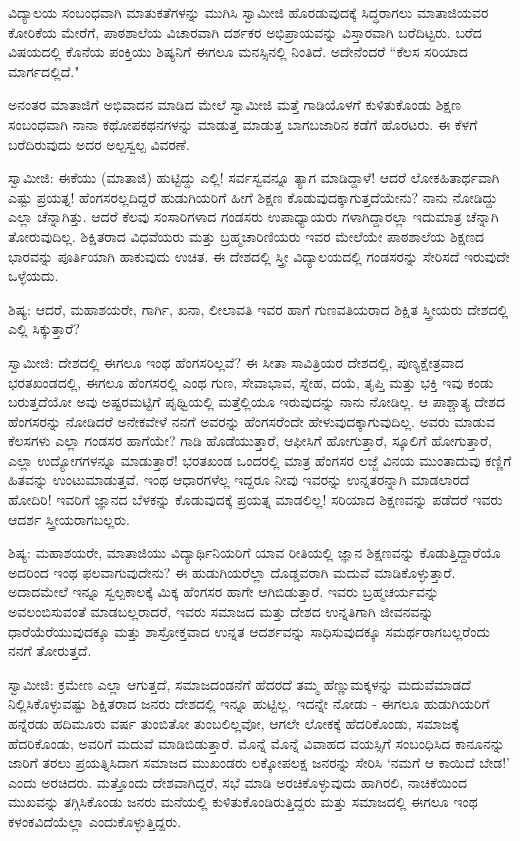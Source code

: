 ವಿದ್ಯಾಲಯ ಸಂಬಂಧವಾಗಿ ಮಾತುಕತೆಗಳನ್ನು ಮುಗಿಸಿ ಸ್ವಾಮೀಜಿ ಹೊರಡುವುದಕ್ಕೆ ಸಿದ್ಧರಾಗಲು ಮಾತಾಜಿಯವರ ಕೋರಿಕೆಯ ಮೇರೆಗೆ, ಪಾಠಶಾಲೆಯ ವಿಚಾರವಾಗಿ ದರ್ಶಕರ ಅಭಿಪ್ರಾಯವನ್ನು ವಿಸ್ತಾರವಾಗಿ ಬರೆದಿಟ್ಟರು. ಬರೆದ ವಿಷಯದಲ್ಲಿ ಕೊನೆಯ ಪಂಕ್ತಿಯು ಶಿಷ್ಯನಿಗೆ ಈಗಲೂ ಮನಸ್ಸಿನಲ್ಲಿ ನಿಂತಿದೆ. ಅದೇನೆಂದರೆ “ಕೆಲಸ ಸರಿಯಾದ ಮಾರ್ಗದಲ್ಲಿದೆ."

ಅನಂತರ ಮಾತಾಜಿಗೆ ಅಭಿವಾದನ ಮಾಡಿದ ಮೇಲೆ ಸ್ವಾಮೀಜಿ ಮತ್ತೆ ಗಾಡಿಯೊಳಗೆ ಕುಳಿತುಕೊಂಡು ಶಿಕ್ಷಣ ಸಂಬಂಧವಾಗಿ ನಾನಾ ಕಥೋಪಕಥನಗಳನ್ನು ಮಾಡುತ್ತ ಮಾಡುತ್ತ ಬಾಗಬಜಾರಿನ ಕಡೆಗೆ ಹೊರಟರು. ಈ ಕೆಳಗೆ ಬರೆದಿರುವುದು ಅದರ ಅಲ್ಪಸ್ವಲ್ಪ ವಿವರಣೆ.

ಸ್ವಾಮೀಜಿ: ಈಕೆಯು (ಮಾತಾಜಿ) ಹುಟ್ಟಿದ್ದು ಎಲ್ಲಿ! ಸರ್ವಸ್ವವನ್ನೂ ತ್ಯಾಗ ಮಾಡಿದ್ದಾಳೆ! ಆದರೆ ಲೋಕಹಿತಾರ್ಥವಾಗಿ ಎಷ್ಟು ಪ್ರಯತ್ನ! ಹೆಂಗಸರಲ್ಲದಿದ್ದರೆ ಹುಡುಗಿಯರಿಗೆ ಹೀಗೆ ಶಿಕ್ಷಣ ಕೊಡುವುದಕ್ಕಾಗುತ್ತದೆಯೇನು? ನಾನು ನೋಡಿದ್ದು ಎಲ್ಲಾ ಚೆನ್ನಾಗಿತ್ತು. ಆದರೆ ಕೆಲವು ಸಂಸಾರಿಗಳಾದ ಗಂಡಸರು ಉಪಾಧ್ಯಾಯರು ಗಳಾಗಿದ್ದಾರಲ್ಲಾ ಇದುಮಾತ್ರ ಚೆನ್ನಾಗಿ ತೋರುವುದಿಲ್ಲ. ಶಿಕ್ಷಿತರಾದ ವಿಧವೆಯರು ಮತ್ತು ಬ್ರಹ್ಮಚಾರಿಣಿಯರು ಇವರ ಮೇಲೆಯೇ ಪಾಠಶಾಲೆಯ ಶಿಕ್ಷಣದ ಭಾರವನ್ನು ಪೂರ್ತಿಯಾಗಿ ಹಾಕುವುದು ಉಚಿತ. ಈ ದೇಶದಲ್ಲಿ ಸ್ತ್ರೀ ವಿದ್ಯಾಲಯದಲ್ಲಿ ಗಂಡಸರನ್ನು ಸೇರಿಸದೆ ಇರುವುದೇ ಒಳ್ಳೆಯದು.

ಶಿಷ್ಯ: ಆದರೆ, ಮಹಾಶಯರೇ, ಗಾರ್ಗಿ, ಖನಾ, ಲೀಲಾವತಿ ಇವರ ಹಾಗೆ ಗುಣವತಿಯರಾದ ಶಿಕ್ಷಿತ ಸ್ತ್ರೀಯರು ದೇಶದಲ್ಲಿ ಎಲ್ಲಿ ಸಿಕ್ಕುತ್ತಾರೆ?

ಸ್ವಾಮೀಜಿ: ದೇಶದಲ್ಲಿ ಈಗಲೂ ಇಂಥ ಹೆಂಗಸರಿಲ್ಲವೆ? ಈ ಸೀತಾ ಸಾವಿತ್ರಿಯರ ದೇಶದಲ್ಲಿ, ಪುಣ್ಯಕ್ಷೇತ್ರವಾದ ಭರತಖಂಡದಲ್ಲಿ, ಈಗಲೂ ಹೆಂಗಸರಲ್ಲಿ ಎಂಥ ಗುಣ, ಸೇವಾಭಾವ, ಸ್ನೇಹ, ದಯೆ, ತೃಪ್ತಿ ಮತ್ತು ಭಕ್ತಿ ಇವು ಕಂಡು ಬರುತ್ತದೆಯೋ ಅವು ಅಷ್ಟರಮಟ್ಟಿಗೆ ಪೃಥ್ವಿಯಲ್ಲಿ ಮತ್ತೆಲ್ಲಿಯೂ ಇರುವುದನ್ನು ನಾನು ನೋಡಿಲ್ಲ. ಆ ಪಾಶ್ಚಾತ್ಯ ದೇಶದ ಹೆಂಗಸರನ್ನು ನೋಡಿದರೆ ಅನೇಕವೇಳೆ ನನಗೆ ಅವರನ್ನು ಹೆಂಗಸರೆಂದೇ ಹೇಳುವುದಕ್ಕಾಗುವುದಿಲ್ಲ. ಅವರು ಮಾಡುವ ಕೆಲಸಗಳು ಎಲ್ಲಾ ಗಂಡಸರ ಹಾಗೆಯೇ? ಗಾಡಿ ಹೊಡೆಯುತ್ತಾರೆ, ಆಫೀಸಿಗೆ ಹೋಗುತ್ತಾರೆ, ಸ್ಕೂಲಿಗೆ ಹೋಗುತ್ತಾರೆ, ಎಲ್ಲಾ ಉದ್ಯೋಗಗಳನ್ನೂ ಮಾಡುತ್ತಾರೆ! ಭರತಖಂಡ ಒಂದರಲ್ಲಿ ಮಾತ್ರ ಹೆಂಗಸರ ಲಜ್ಜೆ ವಿನಯ ಮುಂತಾದುವು ಕಣ್ಣಿಗೆ ಹಿತವನ್ನು ಉಂಟುಮಾಡುತ್ತವೆ. ಇಂಥ ಆಧಾರಗಳೆಲ್ಲ ಇದ್ದರೂ ನೀವು ಇವರನ್ನು ಉನ್ನತರನ್ನಾಗಿ ಮಾಡಲಾರದೆ ಹೋದಿರಿ! ಇವರಿಗೆ ಜ್ಞಾನದ ಬೆಳಕನ್ನು ಕೊಡುವುದಕ್ಕೆ ಪ್ರಯತ್ನ ಮಾಡಲಿಲ್ಲ! ಸರಿಯಾದ ಶಿಕ್ಷಣವನ್ನು ಪಡೆದರೆ ಇವರು ಆದರ್ಶ ಸ್ತ್ರೀಯರಾಗಬಲ್ಲರು.

ಶಿಷ್ಯ: ಮಹಾಶಯರೇ, ಮಾತಾಜಿಯು ವಿದ್ಯಾರ್ಥಿನಿಯರಿಗೆ ಯಾವ ರೀತಿಯಲ್ಲಿ ಜ್ಞಾನ ಶಿಕ್ಷಣವನ್ನು ಕೊಡುತ್ತಿದ್ದಾರೆಯೊ ಅದರಿಂದ ಇಂಥ ಫಲವಾಗುವುದೇನು? ಈ ಹುಡುಗಿಯರೆಲ್ಲಾ ದೊಡ್ಡವರಾಗಿ ಮದುವೆ ಮಾಡಿಕೊಳ್ಳುತ್ತಾರೆ. ಅದಾದಮೇಲೆ ಇನ್ನೂ ಸ್ವಲ್ಪಕಾಲಕ್ಕೆ ಮಿಕ್ಕ ಹೆಂಗಸರ ಹಾಗೇ ಆಗಿಬಿಡುತ್ತಾರೆ. ಇವರು ಬ್ರಹ್ಮಚರ್ಯವನ್ನು ಅವಲಂಬಿಸುವಂತೆ ಮಾಡಬಲ್ಲರಾದರೆ, ಇವರು ಸಮಾಜದ ಮತ್ತು ದೇಶದ ಉನ್ನತಿಗಾಗಿ ಜೀವನವನ್ನು ಧಾರೆಯೆರೆಯುವುದಕ್ಕೂ ಮತ್ತು ಶಾಸ್ರೋಕ್ತವಾದ ಉನ್ನತ ಆದರ್ಶವನ್ನು ಸಾಧಿಸುವುದಕ್ಕೂ ಸಮರ್ಥರಾಗಬಲ್ಲರೆಂದು ನನಗೆ ತೋರುತ್ತದೆ.

ಸ್ವಾಮೀಜಿ: ಕ್ರಮೇಣ ಎಲ್ಲಾ ಆಗುತ್ತದೆ, ಸಮಾಜದಂಡನೆಗೆ ಹೆದರದೆ ತಮ್ಮ ಹೆಣ್ಣುಮಕ್ಕಳನ್ನು ಮದುವೆಮಾಡದೆ ನಿಲ್ಲಿಸಿಕೊಳ್ಳುವಷ್ಟು ಶಿಕ್ಷಿತರಾದ ಜನರು ದೇಶದಲ್ಲಿ ಇನ್ನೂ ಹುಟ್ಟಿಲ್ಲ. ಇದನ್ನೇ ನೋಡು - ಈಗಲೂ ಹುಡುಗಿಯರಿಗೆ ಹನ್ನೆರಡು ಹದಿಮೂರು ವರ್ಷ ತುಂಬಿತೋ ತುಂಬಲಿಲ್ಲವೋ, ಆಗಲೇ ಲೋಕಕ್ಕೆ ಹೆದರಿಕೊಂಡು, ಸಮಾಜಕ್ಕೆ ಹೆದರಿಕೊಂಡು, ಅವರಿಗೆ ಮದುವೆ ಮಾಡಿಬಿಡುತ್ತಾರೆ. ಮೊನ್ನೆ ಮೊನ್ನೆ ವಿವಾಹದ ವಯಸ್ಸಿಗೆ ಸಂಬಂಧಿಸಿದ ಕಾನೂನನ್ನು ಜಾರಿಗೆ ತರಲು ಪ್ರಯತ್ನಿಸಿದಾಗ ಸಮಾಜದ ಮುಖಂಡರು ಲಕ್ಕೋಪಲಕ್ಷ ಜನರನ್ನು ಸೇರಿಸಿ ‘ನಮಗೆ ಆ ಕಾಯಿದೆ ಬೇಡ!’ ಎಂದು ಅರಚಿದರು. ಮತ್ತೊಂದು ದೇಶವಾಗಿದ್ದರೆ, ಸಭೆ ಮಾಡಿ ಅರಚಿಕೊಳ್ಳುವುದು ಹಾಗಿರಲಿ, ನಾಚಿಕೆಯಿಂದ ಮುಖವನ್ನು ತಗ್ಗಿಸಿಕೊಂಡು ಜನರು ಮನೆಯಲ್ಲಿ ಕುಳಿತುಕೊಂಡಿರುತ್ತಿದ್ದರು ಮತ್ತು ಸಮಾಜದಲ್ಲಿ ಈಗಲೂ ಇಂಥ ಕಳಂಕವಿದೆಯೆಲ್ಲಾ ಎಂದುಕೊಳ್ಳುತ್ತಿದ್ದರು.

